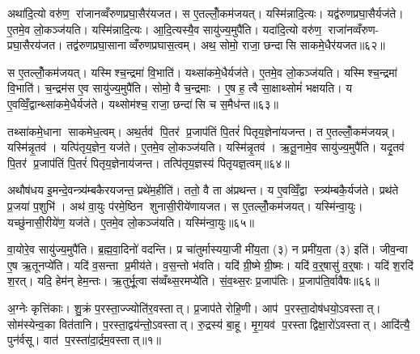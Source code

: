 अथा॑दि॒त्यो वरु॑ण॒ रा॑जानव्वँरुणप्रघा॒सैर॑यजत। स ए॒तल्लोँ॒कम॑जयत्। यस्मि॑न्नादि॒त्यः। यद्व॑रुणप्रघा॒सैर्यज॑ते। ए॒तमे॒व लो॒कञ्ज॑यति। यस्मि॑न्नादि॒त्यः। आ॒दि॒त्यस्यै॒व सायु॑ज्य॒मुपै॑ति। यदा॑दि॒त्यो वरु॑ण॒ राजा॑नव्वँरुण- प्रघा॒सैरय॑जत। तद्व॑रुणप्रघा॒सानाव्वँरुणप्रघास॒त्वम्। अथ॒ सोमो॒ राजा॒ छन्दासि साकमे॒धैर॑यजत॥६२॥

स ए॒तल्लोँ॒कम॑जयत्। यस्मिश्च॒न्द्रमा॑ वि॒भाति॑। यथ्सा॑कमे॒धैर्यज॑ते। ए॒तमे॒व लो॒कञ्ज॑यति। यस्मिश्च॒न्द्रमा॑ वि॒भाति॑। च॒न्द्रम॑स ए॒व सायु॑ज्य॒मुपै॑ति। सोमो॒ वै च॒न्द्रमाः। ए॒ष ह॒ त्वै सा॒क्षाथ्सोमं॑ भक्षयति। य ए॒वव्विँ॒द्वान्थ्सा॑कमे॒धैर्यज॑ते। यथ्सोम॑श्च॒ राजा॒ छन्दा॑सि च स॒मैध॑न्त॥६३॥

तथ्सा॑कमे॒धाना साकमेध॒त्वम्। अथ॒र्तव॑ पि॒तर॑ प्र॒जाप॑तिं पि॒तरं॑ पितृय॒ज्ञेना॑यजन्त। त ए॒तल्लोँ॒कम॑जयन्न्। यस्मि॑न्नृ॒तव॑। यत्पि॑तृय॒ज्ञेन॒ यज॑ते। ए॒तमे॒व लो॒कञ्ज॑यति। यस्मि॑न्नृ॒तव॑। ऋ॒तू॒नामे॒व सायु॑ज्य॒मुपै॑ति। यदृ॒तव॑ पि॒तर॑ प्र॒जाप॑तिं पि॒तरं॑ पितृय॒ज्ञेनाय॑जन्त। तत्पि॑तृय॒ज्ञस्य॑ पितृयज्ञ॒त्वम्॥६४॥

अथौष॑धय इ॒मन्दे॒वन्त्र्य॑म्बकैरयजन्त॒ प्रथे॑म॒हीति॑। ततो॒ वै ता अ॑प्रथन्त। य ए॒वव्विँ॒द्वा स्त्र्य॑म्बकै॒र्यज॑ते। प्रथ॑ते प्र॒जया॑ प॒शुभि॑। अथ॑ वा॒युः प॑रमे॒ष्ठिन शुनासी॒रीये॑णायजत। स ए॒तल्लोँ॒कम॑जयत्। यस्मि॑न्वा॒युः। यच्छु॑नासी॒रीये॑ण॒ यज॑ते। ए॒तमे॒व लो॒कञ्ज॑यति। यस्मि॑न्वा॒युः॥६५॥

वा॒योरे॒व सायु॑ज्य॒मुपै॑ति। ब्र॒ह्म॒वा॒दिनो॑ वदन्ति। प्र चा॑तुर्मास्यया॒जी मी॑य॒ता (३) न प्रमी॑य॒ता (३) इति॑। जीव॒न्वा ए॒ष ऋ॒तूनप्ये॑ति। यदि॑ व॒सन्ता प्र॒मीय॑ते। व॒स॒न्तो भ॑वति। यदि॑ ग्री॒ष्मे ग्री॒ष्मः। यदि॑ व॒र्॒षासु॑ व॒र्॒षाः। यदि॑ श॒रदि॑ श॒रत्। यदि॒ हेम॑न् हेम॒न्तः। ऋ॒तुर्भू॒त्वा स॑व्वँथ्स॒रमप्ये॑ति। सं॒व॒थ्स॒रः प्र॒जाप॑तिः। प्र॒जाप॑ति॒र्वावैषः॥६६॥





\clearpage
{}
\setcounter{anuvakam}{0}
अ॒ग्नेः कृत्ति॑काः। शु॒क्रं प॒रस्ता॒ज्ज्योति॑र॒वस्तात्। प्र॒जाप॑ते रोहि॒णी। आप॑ प॒रस्ता॒दोष॑धयो॒ऽवस्तात्। सोम॑स्येन्व॒का वित॑तानि। प॒रस्ता॒द्वय॑न्तो॒ऽवस्तात्। रु॒द्रस्य॑ बा॒हू। मृ॒ग॒यव॑ प॒रस्ताद्विक्षा॒रो॑ऽवस्तात्। आदि॑त्यै॒ पुन॑र्वसू। वात॑ प॒रस्ता॑दा॒र्द्रम॒वस्तात्॥१॥

